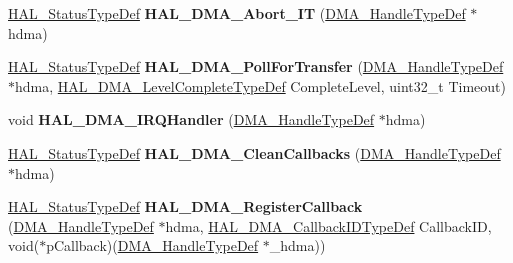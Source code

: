 \begin{DoxyCompactItemize}
\hyperlink{stm32f4xx__hal__def_8h_a63c0679d1cb8b8c684fbb0632743478f}{H\+A\+L\+\_\+\+Status\+Type\+Def} {\bfseries H\+A\+L\+\_\+\+D\+M\+A\+\_\+\+Abort\+\_\+\+IT} (\hyperlink{group___d_m_a___exported___types_ga41b754a906b86bce54dc79938970138b}{D\+M\+A\+\_\+\+Handle\+Type\+Def} $\ast$hdma)
\item 
\mbox{\label{group___d_m_a___exported___functions___group2_ga976a30472df973e3ad983f21289c9b5d}} 
\hyperlink{stm32f4xx__hal__def_8h_a63c0679d1cb8b8c684fbb0632743478f}{H\+A\+L\+\_\+\+Status\+Type\+Def} {\bfseries H\+A\+L\+\_\+\+D\+M\+A\+\_\+\+Poll\+For\+Transfer} (\hyperlink{group___d_m_a___exported___types_ga41b754a906b86bce54dc79938970138b}{D\+M\+A\+\_\+\+Handle\+Type\+Def} $\ast$hdma, \hyperlink{group___d_m_a___exported___types_gaee3245eea8fa938edeb35a6c9596fd86}{H\+A\+L\+\_\+\+D\+M\+A\+\_\+\+Level\+Complete\+Type\+Def} Complete\+Level, uint32\+\_\+t Timeout)
\item 
\mbox{\label{group___d_m_a___exported___functions___group2_ga8c8564d06f6d39b702af1c5cbb7dd54a}} 
void {\bfseries H\+A\+L\+\_\+\+D\+M\+A\+\_\+\+I\+R\+Q\+Handler} (\hyperlink{group___d_m_a___exported___types_ga41b754a906b86bce54dc79938970138b}{D\+M\+A\+\_\+\+Handle\+Type\+Def} $\ast$hdma)
\item 
\mbox{\label{group___d_m_a___exported___functions___group2_gaf511e4e6e0653fafdd9b40ce4a08b1db}} 
\hyperlink{stm32f4xx__hal__def_8h_a63c0679d1cb8b8c684fbb0632743478f}{H\+A\+L\+\_\+\+Status\+Type\+Def} {\bfseries H\+A\+L\+\_\+\+D\+M\+A\+\_\+\+Clean\+Callbacks} (\hyperlink{group___d_m_a___exported___types_ga41b754a906b86bce54dc79938970138b}{D\+M\+A\+\_\+\+Handle\+Type\+Def} $\ast$hdma)
\item 
\mbox{\label{group___d_m_a___exported___functions___group2_gaabec77de08a59c94f2c6265ce7ae8261}} 
\hyperlink{stm32f4xx__hal__def_8h_a63c0679d1cb8b8c684fbb0632743478f}{H\+A\+L\+\_\+\+Status\+Type\+Def} {\bfseries H\+A\+L\+\_\+\+D\+M\+A\+\_\+\+Register\+Callback} (\hyperlink{group___d_m_a___exported___types_ga41b754a906b86bce54dc79938970138b}{D\+M\+A\+\_\+\+Handle\+Type\+Def} $\ast$hdma, \hyperlink{group___d_m_a___exported___types_gafbe8b2bd9ce2128de6cdc08ccde7e8ad}{H\+A\+L\+\_\+\+D\+M\+A\+\_\+\+Callback\+I\+D\+Type\+Def} Callback\+ID, void($\ast$p\+Callback)(\hyperlink{group___d_m_a___exported___types_ga41b754a906b86bce54dc79938970138b}{D\+M\+A\+\_\+\+Handle\+Type\+Def} $\ast$\+\_\+hdma))

\end{DoxyCompactItemize}
